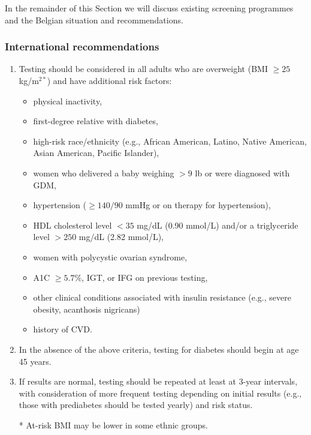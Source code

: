 In the remainder of this Section we will discuss existing screening programmes and the Belgian situation and recommendations.

%
%

\ifx
\subsubsection{International recommendations} \label{intro:screening-recommendations}


\begin{table}[!h]
\colorbox{gray!20!white}{\parbox{\textwidth}{
\begin{enumerate}
\item Testing should be considered in all adults who are overweight (BMI $\geq25$ kg/m$^{2*}$) and have additional risk factors:
\begin{itemize}
\item physical inactivity,
\item first-degree relative with diabetes,
\item high-risk race/ethnicity (e.g., African American, Latino, Native American, Asian American, Pacific Islander),
\item women who delivered a baby weighing $>9$ lb or were diagnosed with GDM,
\item hypertension ($\geq140/90$ mmHg or on therapy for hypertension),
\item HDL cholesterol level $<35$ mg/dL (0.90 mmol/L) and/or a triglyceride level $>250$ mg/dL (2.82 mmol/L),
\item women with polycystic ovarian syndrome,
\item A1C $\geq5.7\%$, IGT, or IFG on previous testing,
\item other clinical conditions associated with insulin resistance (e.g., severe obesity, acanthosis nigricans)
\item history of CVD.
\end{itemize}
\item In the absence of the above criteria, testing for diabetes should begin at age 45 years.
\item If results are normal, testing should be repeated at least at 3-year intervals, with consideration of more frequent testing depending on initial results (e.g., those with prediabetes should be tested yearly) and risk status.
\item[*] At-risk BMI may be lower in some ethnic groups.
\end{enumerate}
}}
\caption{ADA criteria for testing for diabetes in asymptomatic adult individuals, taken from \citep{american2014standards}.}
\label{table:ada-criteria}
\end{table}

